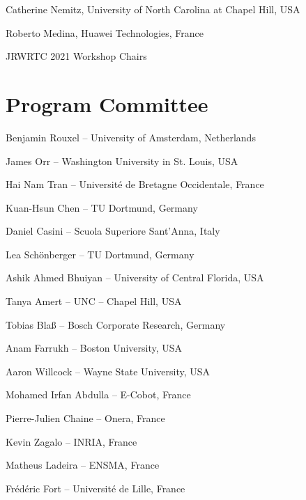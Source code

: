 \documentclass[10pt]{article}
\begin{document}
\begin{flushright}
	Catherine Nemitz, University of North Carolina at Chapel Hill, USA
	
	Roberto Medina, Huawei Technologies, France
	
	JRWRTC 2021 Workshop Chairs
\end{flushright}


\newpage

\section*{Program Committee}


\begin{center}
	Benjamin Rouxel – University of Amsterdam, Netherlands
	
	James Orr – Washington University in St. Louis, USA
	
	Hai Nam Tran – Université de Bretagne Occidentale, France
	
	Kuan-Hsun Chen – TU Dortmund, Germany
	
	Daniel Casini – Scuola Superiore Sant’Anna, Italy
	
	Lea Schönberger – TU Dortmund, Germany
	
	Ashik Ahmed Bhuiyan – University of Central Florida, USA
	
	Tanya Amert – UNC – Chapel Hill, USA
	
	Tobias Blaß – Bosch Corporate Research, Germany
	
	Anam Farrukh – Boston University, USA
	
	Aaron Willcock – Wayne State University, USA
	
	Mohamed Irfan Abdulla – E-Cobot, France
	
	Pierre-Julien Chaine – Onera, France
	
	Kevin Zagalo – INRIA, France
	
	Matheus Ladeira – ENSMA, France
	
	Frédéric Fort – Université de Lille, France
\end{center}
\vspace*{\fill}

	
\end{document}
